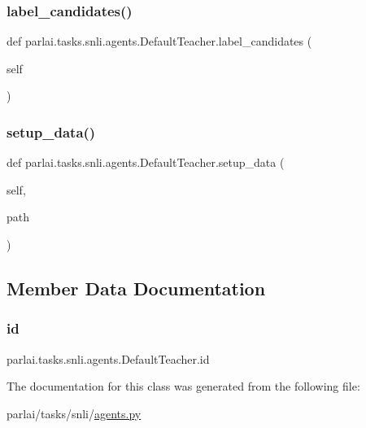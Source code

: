 \subsubsection{\texorpdfstring{label\+\_\+candidates()}{label\_candidates()}}
{\footnotesize\ttfamily def parlai.\+tasks.\+snli.\+agents.\+Default\+Teacher.\+label\+\_\+candidates (\begin{DoxyParamCaption}\item[{}]{self }\end{DoxyParamCaption})}

\mbox{\label{classparlai_1_1tasks_1_1snli_1_1agents_1_1DefaultTeacher_a1f2ea6fcc171a8ca8d2e739d5c929669}} 
\subsubsection{\texorpdfstring{setup\+\_\+data()}{setup\_data()}}
{\footnotesize\ttfamily def parlai.\+tasks.\+snli.\+agents.\+Default\+Teacher.\+setup\+\_\+data (\begin{DoxyParamCaption}\item[{}]{self,  }\item[{}]{path }\end{DoxyParamCaption})}



\subsection{Member Data Documentation}
\mbox{\label{classparlai_1_1tasks_1_1snli_1_1agents_1_1DefaultTeacher_a53a712ad89d4c98e7501d2b307a6481c}} 
\subsubsection{\texorpdfstring{id}{id}}
{\footnotesize\ttfamily parlai.\+tasks.\+snli.\+agents.\+Default\+Teacher.\+id}



The documentation for this class was generated from the following file\+:\begin{DoxyCompactItemize}
\item 
parlai/tasks/snli/\hyperlink{parlai_2tasks_2snli_2agents_8py}{agents.\+py}\end{DoxyCompactItemize}

